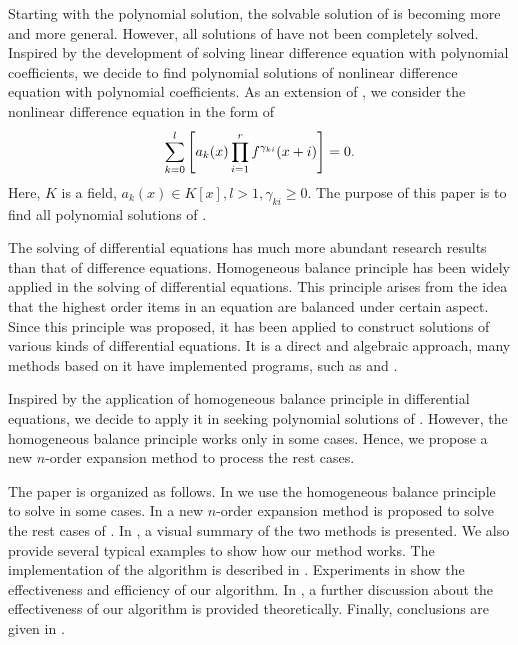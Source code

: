 Starting with the polynomial solution, the solvable solution of  is becoming more and more general. However, all solutions of  have not been completely solved. Inspired by the development of solving linear difference equation with polynomial coefficients, we decide to find polynomial solutions of nonlinear difference equation with polynomial coefficients. As an extension of , we consider the nonlinear difference equation in the form of
\begin{equation}
\sum_{k=0}^l{\left[a_k(x)\prod_{i=1}^r{f^{\gamma_{ki}}(x+i)}\right]}=0.
\label{eq}
\end{equation}
Here, $K$ is a field,  $a_k(x)\in K[x], l>1, \gamma_{ki}\ge 0$. The purpose of this paper is to find all polynomial solutions of .

The solving of differential equations has much more abundant research results than that of difference equations. Homogeneous balance principle has been widely applied in the solving of differential equations. This principle arises from the idea that the highest order items in an equation are balanced under certain aspect. Since this principle was proposed\citep{wang1995solitary,wang1996application}, it has been applied to construct solutions of various kinds of differential equations\citep{hbAppl2006,hbAppl2009a,hbAppl2009b,hbAppl2010}. It is a direct and algebraic approach, many methods based on it have implemented programs, such as \cite{li2002rath} and \cite{li2004raeem}.

Inspired by the application of homogeneous balance principle in differential equations, we decide to apply it in seeking polynomial solutions of . However, the homogeneous balance principle works only in some cases. Hence, we propose a new $n$-order expansion method to process the rest cases.

The paper is organized as follows. In  we use the homogeneous balance principle to solve  in some cases. In  a new $n$-order expansion method is proposed to solve the rest cases of . In , a visual summary of the two methods is presented. We also provide several typical examples to show how our method works. The implementation of the algorithm is described in . Experiments in  show the effectiveness and efficiency of our algorithm. In ,  a further discussion about the effectiveness of our algorithm is provided theoretically. Finally, conclusions are given in .



